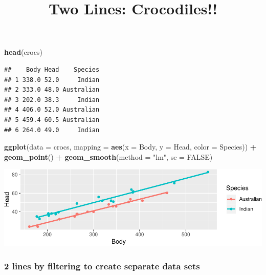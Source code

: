 \documentclass[14pt]{extarticle}
\title{Two Lines: Crocodiles!!}
\author{}
\date{}
\newenvironment{Shaded}{\begin{snugshade}}{\end{snugshade}}
\newcommand{\KeywordTok}[1]{\textcolor[rgb]{0.13,0.29,0.53}{\textbf{#1}}}
\newcommand{\DataTypeTok}[1]{\textcolor[rgb]{0.13,0.29,0.53}{#1}}
\newcommand{\StringTok}[1]{\textcolor[rgb]{0.31,0.60,0.02}{#1}}
\newcommand{\OtherTok}[1]{\textcolor[rgb]{0.56,0.35,0.01}{#1}}
\newcommand{\OperatorTok}[1]{\textcolor[rgb]{0.81,0.36,0.00}{\textbf{#1}}}
\newcommand{\NormalTok}[1]{#1}
\begin{document}
\maketitle

\begin{Shaded}
\begin{Highlighting}[]
\KeywordTok{head}\NormalTok{(crocs)}
\end{Highlighting}
\end{Shaded}

\begin{verbatim}
##    Body Head    Species
## 1 338.0 52.0     Indian
## 2 333.0 48.0 Australian
## 3 202.0 38.3     Indian
## 4 406.0 52.0 Australian
## 5 459.4 60.5 Australian
## 6 264.0 49.0     Indian
\end{verbatim}

\begin{Shaded}
\begin{Highlighting}[]
\KeywordTok{ggplot}\NormalTok{(}\DataTypeTok{data =}\NormalTok{ crocs, }\DataTypeTok{mapping =} \KeywordTok{aes}\NormalTok{(}\DataTypeTok{x =}\NormalTok{ Body, }\DataTypeTok{y =}\NormalTok{ Head, }\DataTypeTok{color =}\NormalTok{ Species)) }\OperatorTok{+}
\StringTok{  }\KeywordTok{geom_point}\NormalTok{() }\OperatorTok{+}
\StringTok{  }\KeywordTok{geom_smooth}\NormalTok{(}\DataTypeTok{method =} \StringTok{"lm"}\NormalTok{, }\DataTypeTok{se =} \OtherTok{FALSE}\NormalTok{)}
\end{Highlighting}
\end{Shaded}

\includegraphics{20181205_two_lines_files/figure-latex/unnamed-chunk-3-1.pdf}

\subsubsection{2 lines by filtering to create separate data
sets}\label{lines-by-filtering-to-create-separate-data-sets}

\begin{Shaded}
\end{Shaded}
\end{document}
